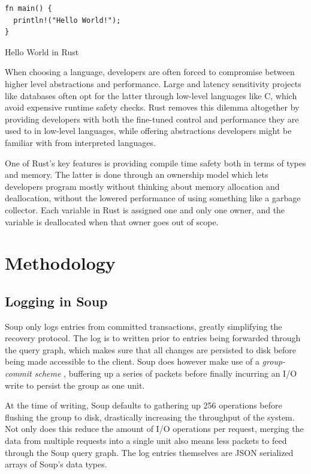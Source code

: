 \documentclass[b5paper]{report}
\begin{document}
\begin{listing}[H]
  \begin{verbatim}
fn main() {
  println!("Hello World!");
}
  \end{verbatim}
  \caption{Hello World in Rust}
\end{listing}

When choosing a language, developers are often forced to compromise between
higher level abstractions and performance. Large and latency sensitivity projects
like databases often opt for the latter through low-level languages like C,
which avoid expensive runtime safety checks. Rust removes this dilemma
altogether by providing developers with both the fine-tuned control and
performance they are used to in low-level languages, while offering abstractions
developers might be familiar with from interpreted languages.

One of Rust's key features is providing compile time safety both in terms of
types and memory. The latter is done through an ownership model which lets
developers program mostly without thinking about memory allocation and
deallocation, without the lowered performance of using something like a garbage
collector. Each variable in Rust is assigned one and only one owner, and the
variable is deallocated when that owner goes out of scope.

\chapter{Methodology} \label{chap:methodology}

\section{Logging in Soup} \label{sec:logging}
Soup only logs entries from committed transactions, greatly simplifying the
recovery protocol. The log is to written prior to entries being forwarded
through the query graph, which makes sure that all changes are persisted to disk
before being made accessible to the client. Soup does however make use of a
\textit{group-commit scheme} \cite{main-memory}, buffering up a series of
packets before finally incurring an I/O write to persist the group as one unit.

At the time of writing, Soup defaults to gathering up 256 operations before
flushing the group to disk, drastically increasing the throughput of the system.
Not only does this reduce the amount of I/O operations per request, merging the
data from multiple requests into a single unit also means less packets to feed
through the Soup query graph. The log entries themselves are JSON \cite{json}
serialized arrays of Soup's data types.
\end{document}
